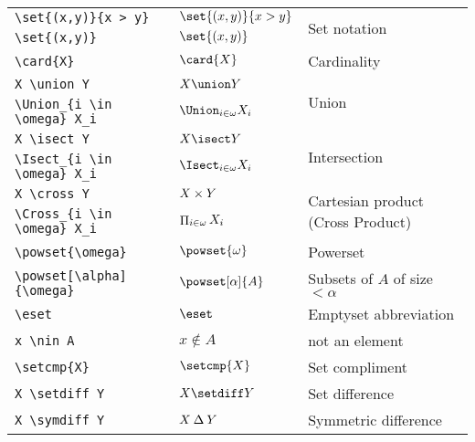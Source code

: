 \documentclass[leqno,11pt]{amsart}
\begin{document}
\begin{tabular}{l |  l | l}\toprule
	\verb=\set{(x,y)}{x > y}=	  &    \(   \set{(x,y)}{x > y} \)    & \multirow{2}{*}{Set notation}  \\[6pt]
	\verb=\set{(x,y)}=			  & 	\(   \set{(x,y)}      \)    &  \\ \midrule
	\verb=\card{X}=                          &    \(   \card{X}                   \)    & Cardinality \\ \midrule
	\verb=X \union Y=                        &    \(   X \union Y                 \)    & \multirow{2}{*}{Union}  \\[6pt]
	\verb=\Union_{i \in \omega} X_i=         &    \(   \Union_{i \in \omega} X_i  \)    &  \\ \midrule
	\verb=X \isect Y=                        &    \(   X \isect Y                 \)    & \multirow{2}{*}{Intersection} \\[6pt]
	\verb=\Isect_{i \in \omega} X_i=         &    \(   \Isect_{i \in \omega} X_i  \)    &  \\ \midrule
	\verb=X \cross Y=                        &    \(   X \mathbin{\times} Y                 \)    & \multirow{2}{*}{Cartesian product (Cross Product)} \\[6pt]
	\verb=\Cross_{i \in \omega} X_i=         &    \(   \mathop{\Pi}_{i \in \omega} X_i  \)    &  \\ \midrule
	\verb=\powset{\omega}=                   &    \(   \powset{\omega}            \)    &   Powerset \\  \midrule
	\verb=\powset[\alpha]{\omega}= 			 &    \(   \powset[\alpha]{A}    \)    & Subsets of \( A \) of  size \( < \alpha \)  \\
	\verb=\eset=                             &    \(   \eset                      \)    &  Emptyset abbreviation\\ \midrule
	\verb=x \nin A=                          &    \(   x \nin A                   \)    &  not an element\\ \midrule
	\verb=\setcmp{X}=                        &    \(   \setcmp{X}                 \)    &  Set compliment\\\midrule
	\verb=X \setdiff Y=                     &    \(   X \setdiff Y              \)    & Set difference \\ \midrule
	\verb=X \symdiff Y=                      &    \(   X \mathbin{\Delta} Y               \)    & Symmetric difference \\ \bottomrule
		\bottomrule
	\end{tabular}          \\
\end{document}
